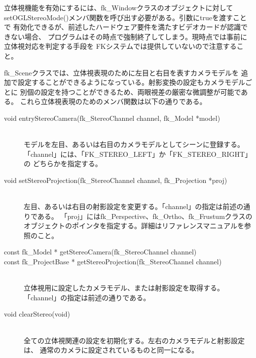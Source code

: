 立体視機能を有効にするには、fk\_Windowクラスのオブジェクトに対して
setOGLStereoMode()メンバ関数を呼び出す必要がある。引数にtrueを渡すことで
有効化できるが、前述したハードウェア要件を満たすビデオカードが認識できない場合、
プログラムはその時点で強制終了してしまう。現時点では事前に立体視対応を判定する手段を
FKシステムでは提供していないので注意すること。

fk\_Sceneクラスでは、立体視表現のために左目と右目を表すカメラモデルを
追加で設定することができるようになっている。射影変換の設定もカメラモデルごとに
別個の設定を持つことができるため、両眼視差の厳密な微調整が可能である。
これら立体視表現のためのメンバ関数は以下の通りである。

\begin{description}
\item[void entryStereoCamera(fk\_StereoChannel channel, fk\_Model *model)] ~ \\
	モデルを左目、あるいは右目のカメラモデルとしてシーンに登録する。
	「channel」には、「FK\_STEREO\_LEFT」か「FK\_STEREO\_RIGHT」の
	どちらかを指定する。\\

\item[void setStereoProjection(fk\_StereoChannel channel, fk\_Projection *proj)] ~ \\
	左目、あるいは右目の射影設定を変更する。「channel」の指定は前述の通りである。
	「proj」にはfk\_Perspective、fk\_Ortho、fk\_Frustumクラスの
	オブジェクトのポインタを指定する。詳細はリファレンスマニュアルを参照のこと。

\item[const fk\_Model * getStereoCamera(fk\_StereoChannel channel)]
\item[const fk\_ProjectBase * getStereoProjection(fk\_StereoChannel channel)] ~ \\
	立体視用に設定したカメラモデル、または射影設定を取得する。
	「channel」の指定は前述の通りである。\\

\item[void clearStereo(void)] ~ \\
	全ての立体視関連の設定を初期化する。左右のカメラモデルと射影設定は、
	通常のカメラに設定されているものと同一になる。
\end{description}

